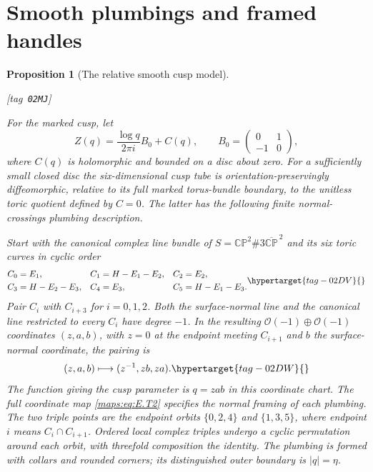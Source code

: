 \documentclass[11pt,a4paper]{article}
\numberwithin{equation}{section}
\newtheorem{proposition}[proposition]{Proposition}
\theoremstyle{definition}
\newcommand{\StatementRecord}[4]{{\upshape\footnotesize[tag~\texttt{#3}]}\enspace\ignorespaces}
\begin{document}
\section{Smooth plumbings and framed handles}\label{pub:V:sec-handles}

\begin{proposition}[The relative smooth cusp model]\hypertarget{tag-02MJ}{}\label{maps:src:E.2.19}
\StatementRecord{maps:src:E.2.19}{proved}{02MJ}{\cref{maps:src:E.2.21}, \cref{maps:src:E.2.16}, \eqref{maps:eq:E.T3}, \eqref{maps:eq:E.T4}, \eqref{maps:eq:E.T8}}


For the marked cusp, let
\[
 Z(q)=\frac{\log q}{2\pi i}B_0+C(q),\qquad
 B_0=\begin{pmatrix}0&1\\-1&0\end{pmatrix},
\]
where $C(q)$ is holomorphic and bounded on a disc about zero.
For a sufficiently small closed disc the six-dimensional
cusp tube is orientation-preservingly diffeomorphic, relative to
its full marked torus-bundle boundary, to the unitless toric
quotient defined by $C=0$.  The latter has the following finite
normal-crossings plumbing description.

Start with the canonical complex line bundle of
$S=\mathbb {CP}^2\#3\overline{\mathbb {CP}}^{\,2}$ and its six
toric curves in cyclic order
\begin{equation}
 \begin{aligned}
 C_0&=E_1,& C_1&=H-E_1-E_2,& C_2&=E_2,\\
 C_3&=H-E_2-E_3,& C_4&=E_3,& C_5&=H-E_1-E_3.
 \end{aligned}
 \hypertarget{tag-02DV}{}\label{maps:eq:E.T1}
\end{equation}
Pair $C_i$ with $C_{i+3}$ for $i=0,1,2$.  Both the surface-normal
line and the canonical line restricted to every $C_i$ have degree
$-1$.  In the resulting $\mathcal O(-1)\oplus\mathcal O(-1)$
coordinates $(z,a,b)$, with $z=0$ at the endpoint meeting
$C_{i+1}$ and $b$ the surface-normal coordinate, the pairing is
\begin{equation}
             (z,a,b)\longmapsto(z^{-1},zb,za).
 \hypertarget{tag-02DW}{}\label{maps:eq:E.T2}
\end{equation}
The function giving the cusp parameter is $q=zab$ in this
coordinate chart.  The full coordinate map \eqref{maps:eq:E.T2} specifies the normal
framing of each plumbing.
The two triple points are the endpoint orbits
$\{0,2,4\}$ and $\{1,3,5\}$, where endpoint $i$ means
$C_i\cap C_{i+1}$.  Ordered local complex triples undergo a
cyclic permutation around each orbit, with threefold composition
the identity.  The plumbing is formed with collars and rounded
corners; its distinguished outer boundary is $|q|=\eta$.

\end{proposition}
\end{document}
